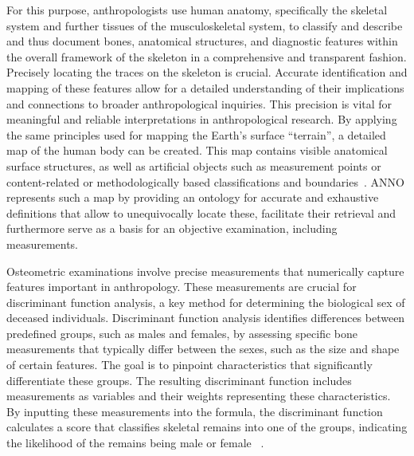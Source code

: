 \documentclass[sw]{iosart2x}
\begin{document}
For this purpose, anthropologists use human anatomy, specifically the skeletal system and further tissues of the musculoskeletal system, to classify and describe and thus document bones, anatomical structures, and diagnostic features within the overall framework of the skeleton in a comprehensive and transparent fashion.
Precisely locating the traces on the skeleton is crucial.
Accurate identification and mapping of these features allow for a detailed understanding of their implications and connections to broader anthropological inquiries.
This precision is vital for meaningful and reliable interpretations in anthropological research.
By applying the same principles used for mapping the Earth's surface \enquote{terrain}, a detailed map of the human body can be created.
This map contains visible anatomical surface structures, as well as artificial objects such as measurement points or content-related or methodologically based classifications and boundaries~\citep{topo}.
ANNO represents such a map by providing an ontology for accurate and exhaustive definitions that allow to unequivocally locate these, facilitate their retrieval and furthermore serve as a basis for an objective examination, including measurements.


Osteometric examinations involve precise measurements that numerically capture features important in anthropology.
These measurements are crucial for discriminant function analysis, a key method for determining the biological sex of deceased individuals.
Discriminant function analysis identifies differences between predefined groups, such as males and females, by assessing specific bone measurements that typically differ between the sexes, such as the size and shape of certain features.
The goal is to pinpoint characteristics that significantly differentiate these groups.
The resulting discriminant function includes measurements as variables and their weights representing these characteristics.
By inputting these measurements into the formula, the discriminant function calculates a score that classifies skeletal remains into one of the groups, indicating the likelihood of the remains being male or female~\citep{prehistoricanthropology} .
\end{document}
